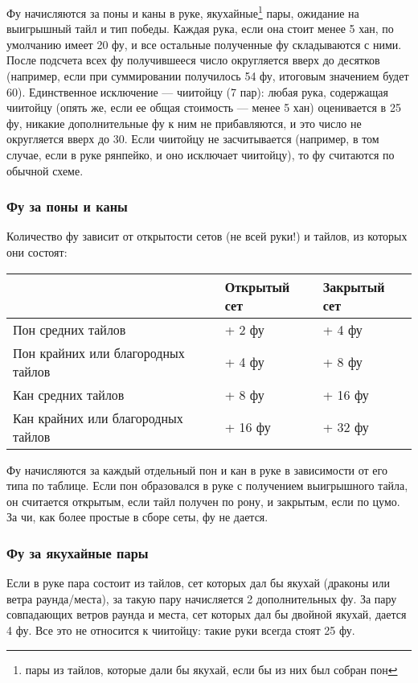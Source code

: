 Фу начисляются за поны и каны в руке, якухайные\footnote{пары из тайлов, которые дали бы якухай, если бы из них был собран пон} пары, ожидание на выигрышный тайл и тип победы. Каждая рука, если она стоит менее 5 хан, по умолчанию имеет 20 фу, и все остальные полученные фу складываются с ними. После подсчета всех фу получившееся число округляется вверх до десятков (например, если при суммировании получилось 54 фу, итоговым значением будет 60). Единственное исключение --- чиитойцу (7 пар): любая рука, содержащая чиитойцу (опять же, если ее общая стоимость --- менее 5 хан) оценивается в 25 фу, никакие дополнительные фу к ним не прибавляются, и это число не округляется вверх до 30. Если чиитойцу не засчитывается (например, в том случае, если в руке рянпейко, и оно исключает чиитойцу), то фу считаются по обычной схеме.

\subsubsection{Фу за поны и каны}

Количество фу зависит от открытости сетов (не всей руки!) и тайлов, из которых они состоят:

\noindent\begin{tabular}{L{7cm}C{3cm}C{3cm}}
	\toprule
	& Открытый сет &
	Закрытый сет \\
	\midrule
	Пон средних тайлов &
	+ 2 фу &
	+ 4 фу \\
	\midrule
	Пон крайних или благородных тайлов &
	+ 4 фу &
	+ 8 фу \\
	\midrule
	Кан средних тайлов &
	+ 8 фу &
	+ 16 фу \\
	\midrule
	Кан крайних или благородных тайлов &
	+ 16 фу &
	+ 32 фу \\
	\bottomrule
\end{tabular}

Фу начисляются за каждый отдельный пон и кан в руке в зависимости от его типа по таблице. Если пон образовался в руке с получением выигрышного тайла, он считается открытым, если тайл получен по рону, и закрытым, если по цумо. За чи, как более простые в сборе сеты, фу не дается.

\subsubsection{Фу за якухайные пары}

Если в руке пара состоит из тайлов, сет которых дал бы якухай (драконы или ветра раунда/места), за такую пару начисляется 2 дополнительных фу. За пару совпадающих ветров раунда и места, сет которых дал бы двойной якухай, дается 4 фу. Все это не относится к чиитойцу: такие руки всегда стоят 25 фу.

